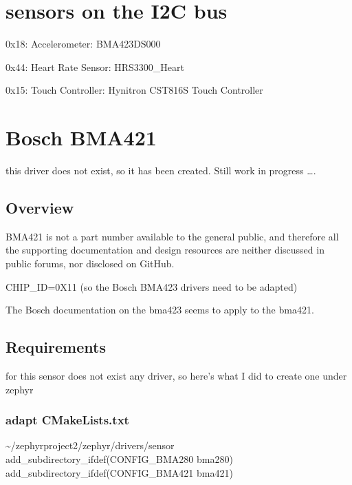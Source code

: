 \documentclass[letterpaper,10pt,english]{sphinxmanual}
\begin{document}
\section{sensors on the I2C bus}
\label{\detokenize{drivers/sensors:sensors-on-the-i2c-bus}}\label{\detokenize{drivers/sensors::doc}}
0x18: Accelerometer: BMA423\sphinxhyphen{}DS000

0x44: Heart Rate Sensor: HRS3300\_Heart

0x15: Touch Controller: Hynitron CST816S Touch Controller


\section{Bosch BMA421}
\label{\detokenize{drivers/bma421:bosch-bma421}}\label{\detokenize{drivers/bma421::doc}}
this driver does not exist, so it has been created.
Still work in progress ….

\begin{sphinxVerbatim}[commandchars=\\\{\}]
\end{sphinxVerbatim}


\subsection{Overview}
\label{\detokenize{drivers/bma421:overview}}
BMA421 is not a part number available to the general public, and therefore all the supporting documentation and design resources are neither discussed in public forums, nor disclosed on GitHub.

CHIP\_ID=0X11  (so the Bosch BMA423 drivers need to be adapted)

The Bosch documentation on the bma423 seems to apply to the bma421.


\subsection{Requirements}
\label{\detokenize{drivers/bma421:requirements}}
for this sensor does not exist any driver, so here’s what I did to create one under zephyr


\subsubsection{adapt CMakeLists.txt}
\label{\detokenize{drivers/bma421:adapt-cmakelists-txt}}
\textasciitilde{}/zephyrproject\sphinxhyphen{}2/zephyr/drivers/sensor
add\_subdirectory\_ifdef(CONFIG\_BMA280            bma280)
add\_subdirectory\_ifdef(CONFIG\_BMA421            bma421)
\end{document}
